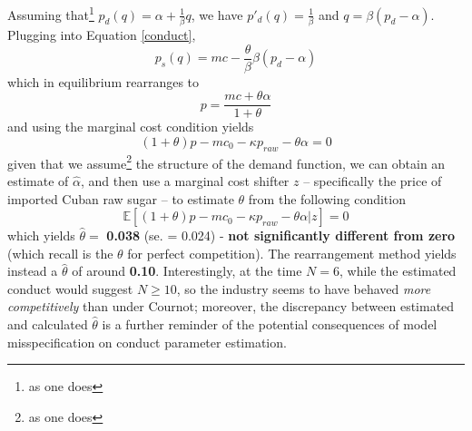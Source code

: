 \documentclass[11pt]{article}
\numberwithin{equation}{section}
\begin{document}
Assuming that\footnote{as one does} $p_d(q) = \alpha + \frac{1}{\beta}q$, we have $p'_d(q) = \frac{1}{\beta}$ and $q = \beta(p_d - \alpha)$. Plugging into Equation \eqref{conduct},
\begin{equation}
	p_s(q) = mc - \frac{\theta}{\beta}\beta(p_d - \alpha)
\end{equation}
which in equilibrium rearranges to
\begin{equation}
	p = \frac{mc + \theta \alpha}{1 + \theta}
\end{equation}
and using the marginal cost condition yields
\begin{equation}
	(1 + \theta) p - mc_0 - \kappa p_{raw} - \theta \alpha = 0
\end{equation}
given that we assume\footnote{as one does} the structure of the demand function, we can obtain an estimate of $\hat{\alpha}$, and then use a marginal cost shifter $z$ -- specifically the price of imported Cuban raw sugar -- to estimate $\theta$ from the following condition
\begin{equation}
	\mathbb{E}[(1 + \theta) p - mc_0 - \kappa p_{raw} - \theta \alpha | z] = 0
\end{equation}
which yields $\hat{\theta} =$ \textbf{0.038} (se. = 0.024) - \textbf{not significantly different from zero} (which recall is the $\theta$ for perfect competition). The rearrangement method yields instead a $\hat{\theta}$ of around \textbf{0.10}.
Interestingly, at the time $N = 6$, while the estimated conduct would suggest $N \geq 10$, so the industry seems to have behaved \textit{more competitively} than under Cournot; moreover, the discrepancy between estimated and calculated $\hat{\theta}$ is a further reminder of the potential consequences of model misspecification on conduct parameter estimation.
\end{document}
